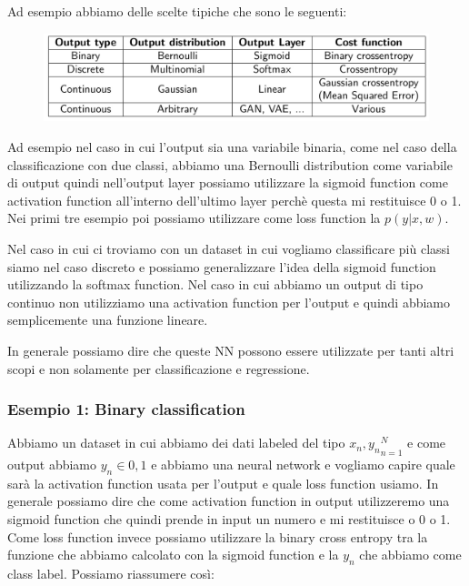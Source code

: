 \documentclass[14pt]{extreport}
\begin{document}
Ad esempio abbiamo delle scelte tipiche che sono le seguenti:

\begin{figure}[H]
\centering
\includegraphics[width=0.7\linewidth]{373.jpeg}
\end{figure}

Ad esempio nel caso in cui l'output sia una variabile binaria, come nel caso della classificazione con due classi, abbiamo una Bernoulli distribution
come variabile di output quindi nell'output layer possiamo utilizzare la sigmoid function come activation function all'interno dell'ultimo layer
perchè questa mi restituisce 0 o 1. Nei primi tre esempio poi possiamo utilizzare come loss function la $p(y|x,w)$.

Nel caso in cui ci troviamo con un dataset in cui vogliamo classificare più classi siamo nel caso discreto e possiamo generalizzare l'idea della
sigmoid function utilizzando la softmax function. Nel caso in cui abbiamo un output di tipo continuo non utilizziamo una activation function per
l'output e quindi abbiamo semplicemente una funzione lineare.

In generale possiamo dire che queste NN possono essere utilizzate per tanti altri scopi e non solamente per classificazione e regressione.

\subsubsection{Esempio 1: Binary classification}

Abbiamo un dataset in cui abbiamo dei dati labeled del tipo ${x_n, y_n}_{n=1}^N$ e come output abbiamo $y_n \in {0,1}$ e abbiamo una neural network e
vogliamo capire quale sarà la activation function usata per l'output e quale loss function usiamo. In generale possiamo dire che come activation
function in output utilizzeremo una sigmoid function che quindi prende in input un numero e mi restituisce o 0 o 1. Come loss function invece possiamo
utilizzare la binary cross entropy tra la funzione che abbiamo calcolato con la sigmoid function e la $y_n$ che abbiamo come class label. Possiamo
riassumere così:
\end{document}
